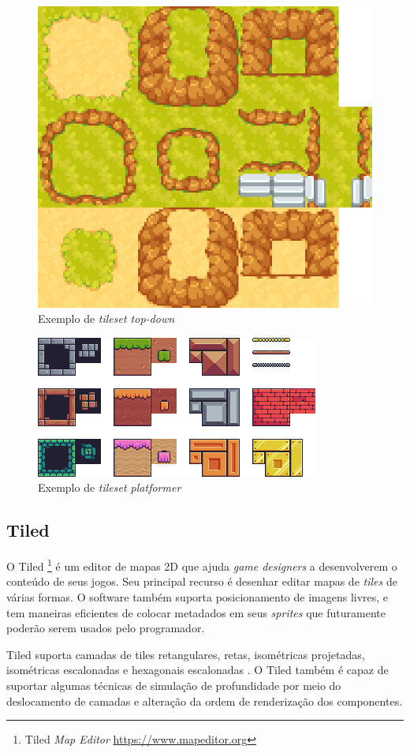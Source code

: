 \begin{figure}[h!]
    \centering
    \includegraphics[width=0.5\linewidth]{figuras/tileset.png}
    \caption{Exemplo de \textit{tileset top-down}}
    \label{fig:tileset-orthogonal}
\end{figure}
\begin{figure}[h!]
    \centering
    \includegraphics[width=0.5\linewidth]{figuras/tileset-orthogonal-platform.png}
    \caption{Exemplo de \textit{tileset platformer}}
    \label{fig:tileset-platform-orthogonal}
\end{figure}

\clearpage
\subsection{Tiled}
\label{sec:tiled}
O Tiled \footnote{Tiled \textit{Map Editor} \url{https://www.mapeditor.org}} é um editor de mapas 2D que ajuda \textit{game designers} a desenvolverem o conteúdo de seus jogos. Seu principal recurso é desenhar editar mapas de \textit{tiles} de várias formas. O software também suporta posicionamento de imagens livres, e tem maneiras eficientes de colocar metadados em seus \textit{sprites} que futuramente poderão serem usados pelo programador.

Tiled suporta camadas de tiles retangulares, retas, isométricas projetadas, isométricas escalonadas e hexagonais escalonadas \cite{tiled}.
O Tiled também é capaz de suportar algumas técnicas de simulação de profundidade por meio do deslocamento de camadas e alteração da ordem de renderização dos componentes.

